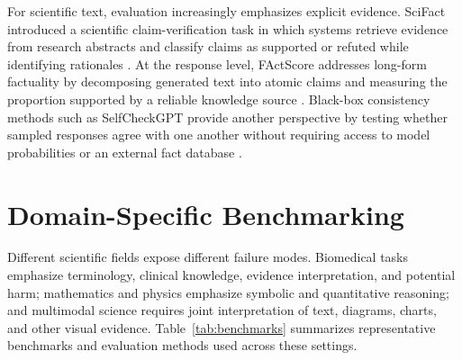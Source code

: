 \documentclass[10pt,a4paper]{article}
\begin{document}
For scientific text, evaluation increasingly emphasizes explicit evidence. SciFact introduced a scientific claim-verification task in which systems retrieve evidence from research abstracts and classify claims as supported or refuted while identifying rationales \cite{wadden2020scifact}. At the response level, FActScore addresses long-form factuality by decomposing generated text into atomic claims and measuring the proportion supported by a reliable knowledge source \cite{min2023factscore}. Black-box consistency methods such as SelfCheckGPT provide another perspective by testing whether sampled responses agree with one another without requiring access to model probabilities or an external fact database \cite{manakul2023selfcheckgpt}.

\section{Domain-Specific Benchmarking}\label{sec:thematic}

Different scientific fields expose different failure modes. Biomedical tasks emphasize terminology, clinical knowledge, evidence interpretation, and potential harm; mathematics and physics emphasize symbolic and quantitative reasoning; and multimodal science requires joint interpretation of text, diagrams, charts, and other visual evidence. Table~\ref{tab:benchmarks} summarizes representative benchmarks and evaluation methods used across these settings.
\end{document}
